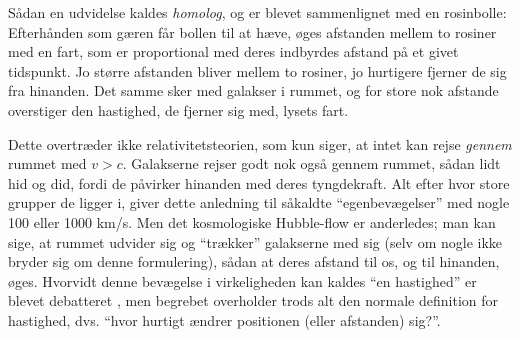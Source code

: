\documentclass[useAMS,danish]{aa}
\begin{document}
Sådan en udvidelse kaldes \emph{homolog}, og er blevet sammenlignet med en rosinbolle:
Efterhånden som gæren får bollen til at hæve, øges afstanden mellem to rosiner med en fart, som er proportional med deres indbyrdes afstand på et givet tidspunkt.
Jo større afstanden bliver mellem to rosiner, jo hurtigere fjerner de sig fra hinanden.
Det samme sker med galakser i rummet, og for store nok afstande overstiger den hastighed, de fjerner sig med, lysets fart.

Dette overtræder ikke relativitetsteorien, som kun siger, at intet kan rejse \emph{gennem} rummet med $v>c$.
Galakserne rejser godt nok også gennem rummet, sådan lidt hid og did, fordi de påvirker hinanden med deres tyngdekraft.
Alt efter hvor store grupper de ligger i, giver dette anledning til såkaldte ``egenbevægelser'' med nogle 100 eller 1000 km/s.
Men det kosmologiske Hubble-flow er anderledes; man kan sige, at rummet udvider sig og ``trækker'' galakserne med sig (selv om nogle ikke bryder sig om denne formulering), sådan at deres afstand til os, og til hinanden, øges.
Hvorvidt denne bevægelse i virkeligheden kan kaldes ``en hastighed'' er blevet debatteret \citep[f.eks.][]{Harrison2000}, men begrebet overholder trods alt den normale definition for hastighed, dvs. ``hvor hurtigt ændrer positionen (eller afstanden) sig?''.
\end{document}
